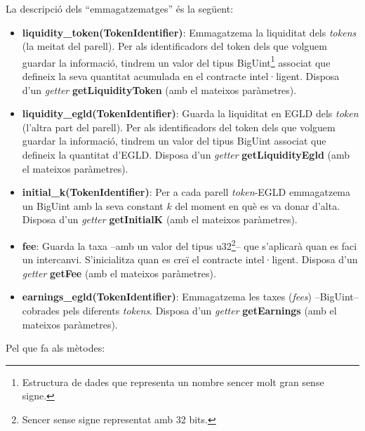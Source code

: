 \documentclass[11pt,a4paper]{article}
\begin{document}
La descripció dels ``emmagatzematges'' és la següent:
\begin{itemize}
\item \textbf{liquidity\_token(TokenIdentifier)}: Emmagatzema la liquiditat dels \textit{tokens} (la meitat del parell). Per als identificadors del token dels que volguem guardar la informació, tindrem un valor del tipus BigUint\footnote{Estructura de dades que representa un nombre sencer molt gran sense signe.} associat que defineix la seva quantitat acumulada en el contracte intel·ligent. Disposa d'un \textit{getter} \textbf{getLiquidityToken} (amb el mateixos paràmetres).
\item \textbf{liquidity\_egld(TokenIdentifier)}: Guarda la liquiditat en EGLD dels \textit{token} (l'altra part del parell). Per als identificadors del token dels que volguem guardar la informació, tindrem un valor del tipus BigUint associat que defineix la quantitat d'EGLD. Disposa d'un \textit{getter} \textbf{getLiquidityEgld} (amb el mateixos paràmetres).
\item \textbf{initial\_k(TokenIdentifier)}: Per a cada parell \textit{token}-EGLD emmagatzema un BigUint amb la seva constant \(k\) del moment en què es va donar d'alta.  Disposa d'un \textit{getter} \textbf{getInitialK} (amb el mateixos paràmetres).
\item \textbf{fee}: Guarda la taxa –amb un valor del tipus u32\footnote{Sencer sense signe representat amb 32 bits.}– que s'aplicarà quan es faci un intercanvi. S'inicialitza quan es creï el contracte intel·ligent. Disposa d'un \textit{getter} \textbf{getFee} (amb el mateixos paràmetres).
\item \textbf{earnings\_egld(TokenIdentifier)}: Emmagatzema les taxes (\textit{fees}) –BigUint– cobrades pels diferents \textit{tokens}. Disposa d'un \textit{getter} \textbf{getEarnings} (amb el mateixos paràmetres).
\end{itemize}
Pel que fa als mètodes:
\end{document}
